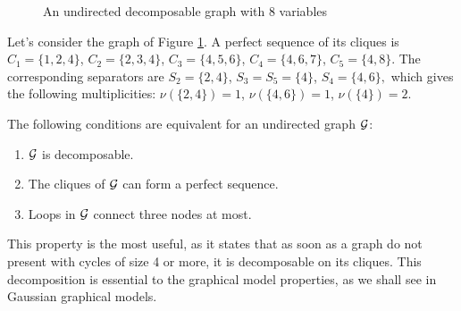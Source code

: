 \begin{figure}[H]
 \begin{center}
 \caption{An undirected decomposable graph with 8 variables}
  \label{ex:graph}
    \end{center}
\end{figure}
 Let's consider the graph of Figure \ref{ex:graph}. A perfect sequence of its cliques is 
$C_1=\{1,2,4\}$, $C_2=\{2,3,4\}$, $C_3=\{4,5,6\}$, $C_4=\{4,6,7\}$, $C_5=\{4,8\}$. The corresponding separators are $S_2=\{2,4\}$, $S_3=S_5=\{4\}$, $S_4=\{4,6\},$ which gives the following multiplicities: $\nu(\{2,4\})=1$,  $\nu(\{4,6\})=1$, $\nu(\{4\})=2$.  


\begin{prop}
\label{decomp}
The following conditions are equivalent for an undirected graph $\mathcal{G}$:
\begin{enumerate}[label=(\roman*)]
\item $\mathcal{G}$ is decomposable.
\item The cliques of $\mathcal{G}$ can form a perfect sequence.
\item Loops in $\mathcal{G}$ connect three nodes at most.
\end{enumerate}
\end{prop}

 This property is the most useful, as it states that as soon as a graph do not present with cycles of size 4 or more, it is decomposable on its cliques. This decomposition is essential to the graphical model properties, as we shall see in Gaussian graphical models.
 
